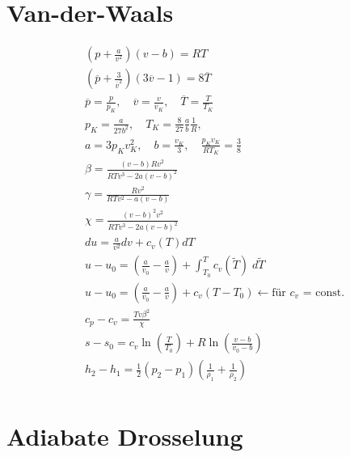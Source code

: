 \documentclass[twocolumn]{article}
\begin{document}
\section{Van-der-Waals}
\begin{align*}
	&\left(p + \frac{a}{v^2}\right)(v-b) = RT 
	\\
	&\left(\overline{p} + \frac{3}{\overline{v}^2}\right)(3\overline{v}-1) = 8\overline{T} 
	\\
	&\overline{p} = \frac{p}{p_K}, \quad \overline{v} = \frac{v}{v_K}, \quad \overline{T} = \frac{T}{T_K} 
	\\
	&p_K = \frac{a}{27b^2}, \quad T_K = \frac{8}{27}\frac{a}{b}\frac{1}{R}, \quad %
	\\
	&a=3p_Kv^2_K, \quad b =\frac{v_K}{3}, \quad \frac{p_Kv_K}{RT_K} = \frac{3}{8} 
	\\
	&\beta = \frac{(v-b)Rv^2}{RTv^3 - 2a(v-b)^2} 
	\\ 
	&\gamma = \frac{Rv^2}{RTv^2 - a(v-b)} 
	\\
	&\chi = \frac{(v-b)^2v^2}{RTv^3 - 2a(v-b)^2} 
	\\
	& du = \frac{a}{v^2}dv + c_v(T)dT 
	\\
	&u-u_0 = \left( \frac{a}{v_0} - \frac{a}{v} \right) + \int_{T_0}^{T} c_v(\tilde{T})\; d\tilde{T} 
	\\
	& u - u_0 = \left(\frac{a}{v_0} - \frac{a}{v} \right) + c_v(T-T_0) \leftarrow \text{für $c_v$ = const.} 
	\\
	&c_p - c_v = \frac{Tv\beta^2}{\chi} 
	\\
	& s- s_0 = c_v \ln \left( \frac{T}{T_0} \right) + R \ln \left(\frac{v-b}{v_0 - b} \right)
	\\
	& h_2 - h_1 = \frac{1}{2}(p_2 - p_1) \left( \frac{1}{\rho_1} + \frac{1}{\rho_2}\right)
	\\
\end{align*}

%                                           
\section{Adiabate Drosselung}
\end{document}
